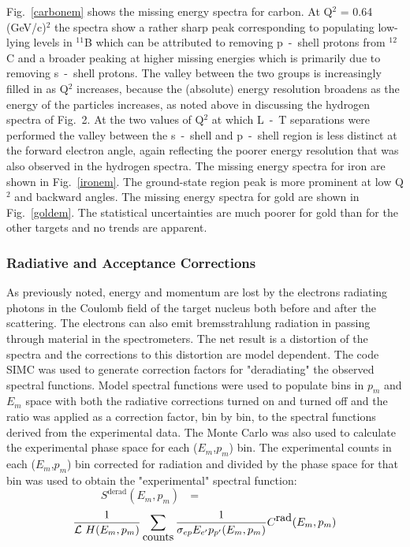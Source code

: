 \documentclass[aps,prl,twocolumn,showpacs,amsmath,amssymb,floats]{revtex4}
\begin{document}
Fig.~\ref{carbonem} shows the missing energy spectra for carbon.  At Q$^2$ = 
0.64 (GeV/c)$^2$ the spectra show a rather sharp peak corresponding to 
populating low-lying levels in $^{11}$B which can be attributed to removing p~-~shell protons from $^{12}$C and a broader peaking at higher missing energies 
which is primarily due to removing s~-~shell protons.  The valley between the two 
groups is increasingly filled in as Q$^2$ increases, because the (absolute) 
energy resolution broadens as the energy of the particles increases, as noted 
above in discussing the hydrogen spectra of Fig.~2.  At the 
two values of Q$^2$ at which L~-~T separations were performed the valley between the s~-~shell and p~-~shell region is less distinct at the forward electron angle, again reflecting the poorer energy resolution that was also observed in the hydrogen spectra.  The missing energy spectra for iron are shown in Fig.~\ref{ironem}. 
The ground-state region peak is more prominent at low Q$^2$ and backward angles. 
The missing energy spectra for gold are shown in Fig.~\ref{goldem}. The 
statistical uncertainties are much poorer for gold than for the other targets 
and no trends are apparent.


\subsubsection*{Radiative and Acceptance Corrections}
As previously noted, energy and momentum are lost by the electrons radiating 
photons in the Coulomb field of the target nucleus both before and after the 
scattering.  The electrons can also emit bremsstrahlung radiation in passing 
through material in the spectrometers.  The net result is a distortion of the 
spectra and the corrections to this distortion are model dependent.  The code 
SIMC was used to generate correction factors for "deradiating" the observed 
spectral functions.  Model spectral functions were used to populate bins 
in $p_m$ and $E_m$ space with both the radiative corrections turned on and 
turned off and the ratio was applied as a correction factor, bin by bin, to 
the spectral functions derived from the experimental data.  The Monte Carlo 
was also used to calculate the experimental phase space for each ($E_m$,$p_m$) bin. The experimental counts in 
each ($E_m$,$p_m$) bin corrected for radiation and divided by the phase space 
for that bin was used to obtain the "experimental" spectral function:
$$
S^{\mbox{derad}}(E_{m},p_{m})~~~=~~~~~~~~~~~~~~~~~~~~~~~~~~~~~~~~~~~~~~~~~~~~  
$$
\begin{equation}
 \frac{1}{{\cal L}~H(E_m,p_m)}\sum_{\mbox{counts}}{\frac{1}{\sigma_{ep}E_{e'}p_{p'}(E_m,p_m)}}C^{{\mbox{rad}}}(E_m,p_m)
\end{equation}
\end{document}
